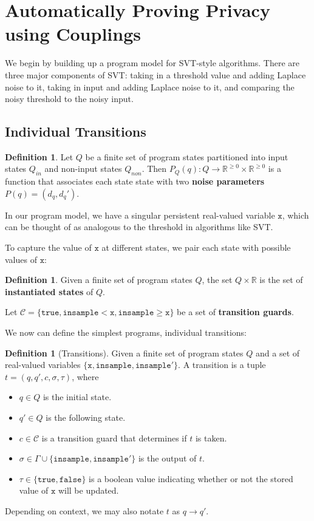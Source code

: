 \documentclass[12pt]{article}
\newcommand{\RR}{\mathbb{R}}
\newcommand{\gguard}[1][x]{\texttt{insample}\geq #1}
\newcommand{\lguard}[1][x]{\texttt{insample} < #1}
\theoremstyle{definition}
\newtheorem{defn}[thm]{Definition}
\begin{document}
\section{Automatically Proving Privacy using Couplings}

We begin by building up a program model for SVT-style algorithms. There are three major components of SVT: taking in a threshold value and adding Laplace noise to it, taking in input and adding Laplace noise to it, and comparing the noisy threshold to the noisy input. 


\subsection{Individual Transitions}


\begin{defn}
    Let $Q$ be a finite set of program states partitioned into input states $Q_{in}$ and non-input states $Q_{non}$. Then $P_Q(q): Q\to \RR^{\geq 0}\times \RR^{\geq 0}$ is a function that associates each state state with two \textbf{noise parameters} $P(q) = (d_q, d_q')$.
\end{defn}

In our program model, we have a singular persistent real-valued variable $\texttt{x}$, which can be thought of as analogous to the threshold in algorithms like SVT. 

To capture the value of $\texttt{x}$ at different states, we pair each state with possible values of $\texttt{x}$:

\begin{defn}
    Given a finite set of program states $Q$, the set $Q\times \RR$ is the set of \textbf{instantiated states} of $Q$. 
\end{defn}

Let $\mathcal{C}=\{\texttt{true}, \lguard[\texttt{x}], \gguard[\texttt{x}]\}$ be a set of \textbf{transition guards}.

We now can define the simplest programs, individual transitions:

\begin{defn}[Transitions]
    Given a finite set of program states $Q$ and a set of real-valued variables $\{\texttt{x}, \texttt{insample}, \texttt{insample}'\}$. A transition is a tuple $t = (q, q', c, \sigma, \tau)$, where \begin{itemize}
        \item $q\in Q$ is the initial state.
        \item $q'\in Q$ is the following state.
        \item $c\in \mathcal{C}$ is a transition guard that determines if $t$ is taken.
        \item $\sigma \in \Gamma\cup\{\texttt{insample}, \texttt{insample}'\}$ is the output of $t$.
        \item $\tau\in\{\texttt{true}, \texttt{false}\}$ is a boolean value indicating whether or not the stored value of $\texttt{x}$ will be updated.
    \end{itemize}
    Depending on context, we may also notate $t$ as $q\to q'$. 
\end{defn}
\end{document}
